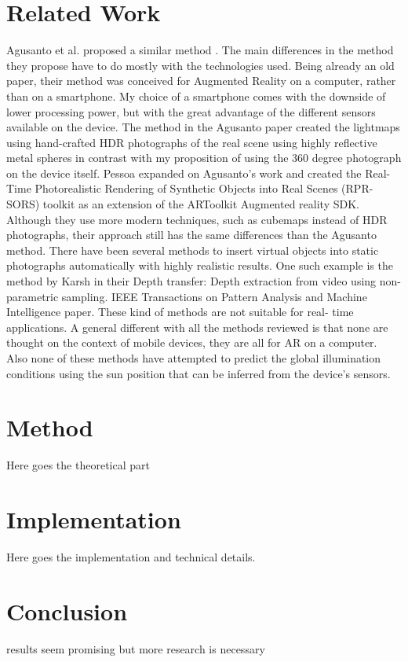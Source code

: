 \documentclass{article}
\begin{document}
\section{Related Work}
Agusanto et al. proposed a similar method \cite{agusanto2003}. The main differences in the method they propose have to do mostly with the technologies used. Being already an old paper, their method was conceived for Augmented Reality on a computer, rather than on a smartphone. My choice of a smartphone comes with the downside of lower processing power, but with the great advantage of the different sensors available on the device. The method in the Agusanto paper created the lightmaps using hand-crafted HDR photographs of the real scene using highly reflective metal spheres in contrast with my proposition of using the 360 degree photograph on the device itself.
Pessoa\cite{pessoa2011} expanded on Agusanto's work and created the Real-Time Photorealistic Rendering of Synthetic Objects into Real Scenes (RPR-SORS) toolkit as an extension of the ARToolkit Augmented reality SDK. Although they use more modern techniques, such as cubemaps instead of HDR photographs, their approach still has the same differences than the Agusanto method.
There have been several methods to insert virtual objects into static photographs automatically with highly realistic results. One such example is the method by Karsh \cite{karsh2014} in their Depth transfer: Depth extraction from video using non-parametric sampling. IEEE Transactions on Pattern Analysis and Machine Intelligence paper. These kind of methods are not suitable for real- time applications.
A general different with all the methods reviewed is that none are thought on the context of mobile devices, they are all for AR on a computer. Also none of these methods have attempted to predict the global illumination conditions using the sun position that can be inferred from the device's sensors.

\section{Method}
Here goes the theoretical part

\section{Implementation}
Here goes the implementation and technical details.

\section{Conclusion}
results seem promising but more research is necessary



\end{document}
